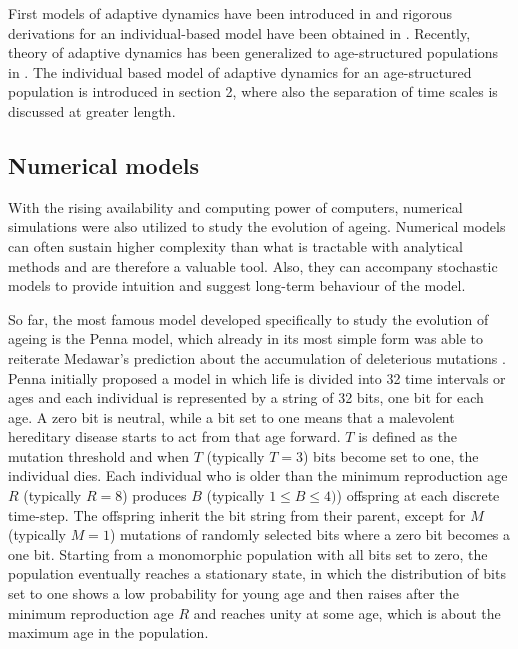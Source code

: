 \documentclass[11pt, a4paper]{article}
\theoremstyle{definition}
\begin{document}
    First models of adaptive dynamics have been introduced in \autocite{hofbauer1990, metz1995ad, dieckmann1996} and rigorous derivations for an individual-based model have been obtained in \autocite{champagnat2006tss, champmel2006}. Recently, theory of adaptive dynamics has been generalized to age-structured populations in \autocite{meleard2009tss}. The individual based model of adaptive dynamics for an age-structured population is introduced in section 2, where also the separation of time scales is discussed at greater length.


\subsection{Numerical models}
    With the rising availability and computing power of computers, numerical simulations were also utilized to study the evolution of ageing. Numerical models can often sustain higher complexity than what is tractable with analytical methods and are therefore a valuable tool. Also, they can accompany stochastic models to provide intuition and suggest long-term behaviour of the model.
    
    So far, the most famous model developed specifically to study the evolution of ageing is the Penna model, which already in its most simple form was able to reiterate Medawar's prediction about the accumulation of deleterious mutations \autocite{penna1995bit}.
    Penna initially proposed a model in which life is divided into 32 time intervals or ages and each individual is represented by a string of 32 bits, one bit for each age. A zero bit is neutral, while a bit set to one means that a malevolent hereditary disease starts to act from that age forward. $T$ is defined as the mutation threshold and when $T$ (typically $T=3$) bits become set to one, the individual dies. Each individual who is older than the minimum reproduction age $R$ (typically $R=8$) produces $B$ (typically $1 \leq B \leq 4)$) offspring at each discrete time-step. The offspring inherit the bit string from their parent, except for $M$ (typically $M=1$) mutations of randomly selected bits where a zero bit becomes a one bit. Starting from a monomorphic population with all bits set to zero, the population eventually reaches a stationary state, in which the distribution of bits set to one shows a low probability for young age and then raises after the minimum reproduction age $R$ and reaches unity at some age, which is about the maximum age in the population.
\end{document}
